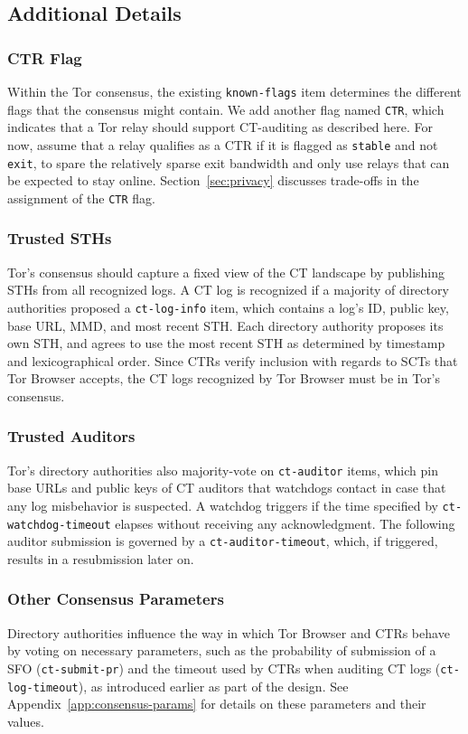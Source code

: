 \subsection{Additional Details} \label{sec:base:consensus}

\subsubsection{CTR Flag} \label{sec:base:consensus:ctr-flag} Within the Tor
consensus, the existing \texttt{known-flags} item determines the different flags
that the consensus might contain.  We add another flag named \texttt{CTR}, which
indicates that a Tor relay should support CT-auditing as described here. For
now, assume that a relay qualifies as a CTR if it is flagged as \texttt{stable}
and not \texttt{exit}, to spare the relatively sparse exit bandwidth and only
use relays that can be expected to stay online. Section~\ref{sec:privacy}
discusses trade-offs in the assignment of the \texttt{CTR} flag.

\subsubsection{Trusted STHs}
Tor's consensus should capture a fixed view of the CT landscape by publishing
STHs from all recognized logs.  A CT log is recognized if a majority of
directory authorities proposed a \texttt{ct-log-info} item, which contains a
log's ID, public key, base URL, MMD, and most recent STH\@.  Each directory
authority proposes its own STH, and agrees to use the most recent STH as
determined by timestamp and lexicographical order.  Since CTRs verify inclusion
with regards to SCTs that Tor Browser accepts, the CT logs recognized by Tor Browser must be in
Tor's consensus.

\subsubsection{Trusted Auditors}
Tor's directory authorities also majority-vote on \texttt{ct-auditor} items,
which pin base URLs and public keys of CT auditors that watchdogs contact in
case that any log misbehavior is suspected.  A watchdog triggers if the time
specified by \texttt{ct-watchdog-timeout} elapses without receiving any
acknowledgment.  The following auditor submission is governed by a
\texttt{ct-auditor-timeout}, which, if triggered, results in a resubmission
later on.

\subsubsection{Other Consensus Parameters} \label{sec:base:consensus:params}
Directory authorities influence the way in which Tor Browser and CTRs behave by voting on
necessary parameters, such as the probability of submission of a SFO
(\texttt{ct-submit-pr}) and the timeout used by CTRs when auditing CT logs
(\texttt{ct-log-timeout}), as introduced earlier as part of the design. See
Appendix~\ref{app:consensus-params} for details on these parameters and their
values.
